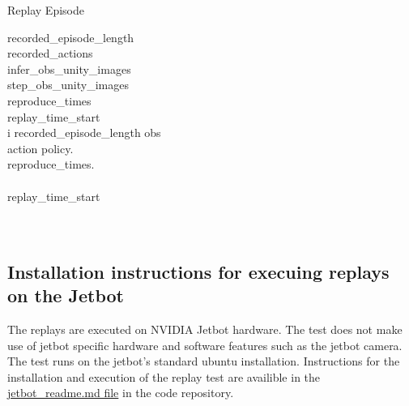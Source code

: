 \renewcommand{\thepseudonum}{\roman{pseudonum}}
\begin{pseudocode}{Replay Episode}{ }
\\


recorded\_episode\_length \GETS {}\\
recorded\_actions \GETS {}\\
infer\_obs\_unity\_images \GETS {}\\
step\_obs\_unity\_images \GETS {}\\

reproduce\_times \GETS [] \\

replay\_time\_start \GETS {}\\

\FOR i  \TO recorded\_episode\_length \DO
\BEGIN
obs \GETS {}\\
action \GETS policy.\\
reproduce\_times.\\

\\

replay\_time\_start \GETS {}\\

\\
\END\\
\ENDPROCEDURE

\label{pseudocode:replay_episode}
\end{pseudocode}

\subsection{Installation instructions for execuing replays on the Jetbot}

The replays are executed on NVIDIA Jetbot hardware. The test does not make use of jetbot specific hardware and software features such as the jetbot camera. The test runs on the jetbot's standard ubuntu installation. Instructions for the installation and execution of the replay test are availible in the \href{https://github.com/geschnee/carsim-rl-cnn/blob/main/replays_on_jetbot.md}{jetbot\_readme.md file} in the code repository. 



